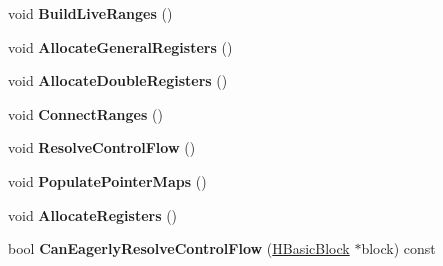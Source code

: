 \begin{DoxyCompactItemize}
\item 
void {\bfseries Build\+Live\+Ranges} ()\hypertarget{classv8_1_1internal_1_1_b_a_s_e___e_m_b_e_d_d_e_d_a7230e7b4ca17169aedd32b9df3283214}{}\label{classv8_1_1internal_1_1_b_a_s_e___e_m_b_e_d_d_e_d_a7230e7b4ca17169aedd32b9df3283214}

\item 
void {\bfseries Allocate\+General\+Registers} ()\hypertarget{classv8_1_1internal_1_1_b_a_s_e___e_m_b_e_d_d_e_d_a17050a418f2f87933bc2d89751331d7a}{}\label{classv8_1_1internal_1_1_b_a_s_e___e_m_b_e_d_d_e_d_a17050a418f2f87933bc2d89751331d7a}

\item 
void {\bfseries Allocate\+Double\+Registers} ()\hypertarget{classv8_1_1internal_1_1_b_a_s_e___e_m_b_e_d_d_e_d_aa999a090cac2ef33d77b41d5dbf1f5ae}{}\label{classv8_1_1internal_1_1_b_a_s_e___e_m_b_e_d_d_e_d_aa999a090cac2ef33d77b41d5dbf1f5ae}

\item 
void {\bfseries Connect\+Ranges} ()\hypertarget{classv8_1_1internal_1_1_b_a_s_e___e_m_b_e_d_d_e_d_a993d26f4f262e43d6e41b1abfb0bdd46}{}\label{classv8_1_1internal_1_1_b_a_s_e___e_m_b_e_d_d_e_d_a993d26f4f262e43d6e41b1abfb0bdd46}

\item 
void {\bfseries Resolve\+Control\+Flow} ()\hypertarget{classv8_1_1internal_1_1_b_a_s_e___e_m_b_e_d_d_e_d_a807dc6292d1948994a9510beecbeec44}{}\label{classv8_1_1internal_1_1_b_a_s_e___e_m_b_e_d_d_e_d_a807dc6292d1948994a9510beecbeec44}

\item 
void {\bfseries Populate\+Pointer\+Maps} ()\hypertarget{classv8_1_1internal_1_1_b_a_s_e___e_m_b_e_d_d_e_d_a024bae2eb8cd911b0c4876542c25d922}{}\label{classv8_1_1internal_1_1_b_a_s_e___e_m_b_e_d_d_e_d_a024bae2eb8cd911b0c4876542c25d922}

\item 
void {\bfseries Allocate\+Registers} ()\hypertarget{classv8_1_1internal_1_1_b_a_s_e___e_m_b_e_d_d_e_d_abca9c9618597da5b39d7504c2fbe58c4}{}\label{classv8_1_1internal_1_1_b_a_s_e___e_m_b_e_d_d_e_d_abca9c9618597da5b39d7504c2fbe58c4}

\item 
bool {\bfseries Can\+Eagerly\+Resolve\+Control\+Flow} (\hyperlink{classv8_1_1internal_1_1_h_basic_block}{H\+Basic\+Block} $\ast$block) const \hypertarget{classv8_1_1internal_1_1_b_a_s_e___e_m_b_e_d_d_e_d_a326718f1c9538744e37325a69282e05c}{}\label{classv8_1_1internal_1_1_b_a_s_e___e_m_b_e_d_d_e_d_a326718f1c9538744e37325a69282e05c}


\end{DoxyCompactItemize}
